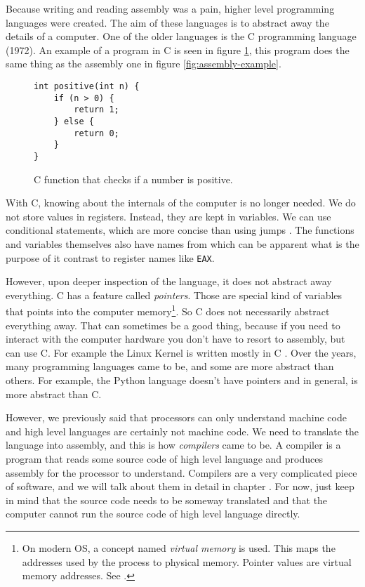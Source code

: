 Because writing and reading assembly was a pain, higher level programming
languages were created. The aim of these languages is to abstract away the
details of a computer. One of the older languages is the C programming language
(1972). An example of a program in C is seen in figure \ref{fig:c-positive},
this program does the same thing as the assembly one in figure
\ref{fig:assembly-example}.

\begin{figure}\label{fig:c-positive}
\begin{verbatim}
int positive(int n) {
    if (n > 0) {
        return 1;
    } else {
        return 0;
    }
}
\end{verbatim}
\caption{C function that checks if a number is positive.}
\end{figure}

With C, knowing about the internals of the computer is no longer needed. We do
not store values in registers. Instead, they are kept in variables. We can use
conditional statements, which are more concise than using jumps \cite{gotobad}.
The functions and variables themselves also have names from which can be
apparent what is the purpose of it contrast to register names like
\texttt{EAX}.

However, upon deeper inspection of the language, it does not abstract away
everything. C has a feature called \textit{pointers}. Those are special kind of
variables that points into the computer memory\footnote{On modern OS, a concept
named \textit{virtual memory} is used. This maps the addresses used by the
process to physical memory. Pointer values are virtual memory addresses. See
\cite{modern-os}.}. So C does not necessarily abstract everything away. That
can sometimes be a good thing, because if you need to interact with the
computer hardware you don't have to resort to assembly, but can use C. For
example the Linux Kernel is written mostly in C \cite{linux-source}. Over the
years, many programming languages came to be, and some are more abstract than
others. For example, the Python language doesn't have pointers and in general,
is more abstract than C.

However, we previously said that processors can only understand machine code
and high level languages are certainly not machine code. We need to translate
the language into assembly, and this is how \textit{compilers} came to be. A
compiler is a program that reads some source code of high level language and
produces assembly for the processor to understand. Compilers are a very
complicated piece of software, and we will talk about them in detail in chapter
. For now, just keep in mind that the source
code needs to be someway translated and that the computer cannot run the source
code of high level language directly.

